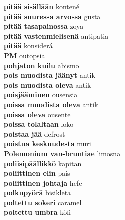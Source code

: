 \textbf{ pitää sisällään  } kontené \\
\textbf{ pitää suuressa arvossa  } gusta \\
\textbf{ pitää tasapainossa  } zoya \\
\textbf{ pitää vastenmielisenä  } antipatia \\
\textbf{ pitää  } konsiderá \\
\textbf{ PM  } outopsia \\
\textbf{ pohjaton kuilu  } abismo \\
\textbf{ pois muodista jäänyt  } antik \\
\textbf{ pois muodista oleva  } antik \\
\textbf{ poisjääminen  } ousensia \\
\textbf{ poissa muodista oleva  } antik \\
\textbf{ poissa oleva  } ousente \\
\textbf{ poissa tolaltaan  } loko \\
\textbf{ poistaa jää  } defrost \\
\textbf{ poistua keskuudesta  } muri \\
\textbf{ Polemonium van-bruntiae  } limosna \\
\textbf{ poliisipäällikkö  } kapitan \\
\textbf{ poliittinen elin  } pais \\
\textbf{ poliittinen johtaja  } hefe \\
\textbf{ polkupyörä  } bisikleta \\
\textbf{ poltettu sokeri  } caramel \\
\textbf{ poltettu umbra  } kòfi \\
